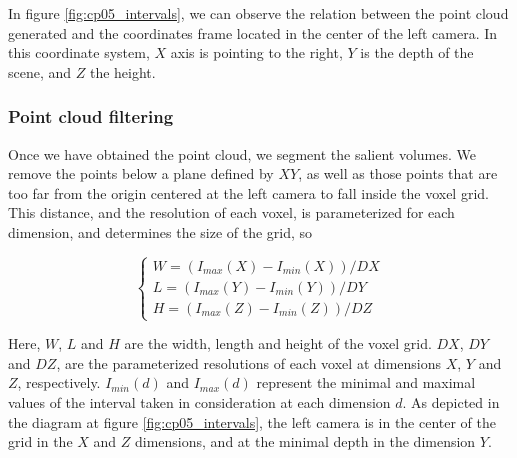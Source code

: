 In figure \ref{fig:cp05_intervals}, we can observe the relation between the point cloud generated and the coordinates frame located in the center of the left camera. In this coordinate system, $X$ axis is pointing to the right, $Y$ is the depth of the scene, and $Z$ the height.


\subsubsection{Point cloud filtering}\label{ch:chapter05_01_01_01}

Once we have obtained the point cloud, we segment the salient volumes. We remove the points below a plane defined by $XY$, as well as those points that are too far from the origin centered at the left camera to fall inside the voxel grid. This distance, and the resolution of each voxel, is parameterized for each dimension, and determines the size of the grid, so

\begin{equation}\label{eq:cp05_filter_limits}
\begin{cases}
W = (I_{max}(X) - I_{min}(X)) / {DX} \\
L = (I_{max}(Y) - I_{min}(Y)) / {DY} \\
H = (I_{max}(Z) - I_{min}(Z)) / {DZ}
\end{cases}
\end{equation}

Here, $W$, $L$ and $H$ are the width, length and height of the voxel grid. $DX$, $DY$ and $DZ$, are the parameterized resolutions of each voxel at dimensions $X$, $Y$ and $Z$, respectively. $I_{min}(d)$ and $I_{max}(d)$ represent the minimal and maximal values of the interval taken in consideration at each dimension $d$. As depicted in the diagram at figure \ref{fig:cp05_intervals}, the left camera is in the center of the grid in the $X$ and $Z$ dimensions, and at the minimal depth in the dimension $Y$.

